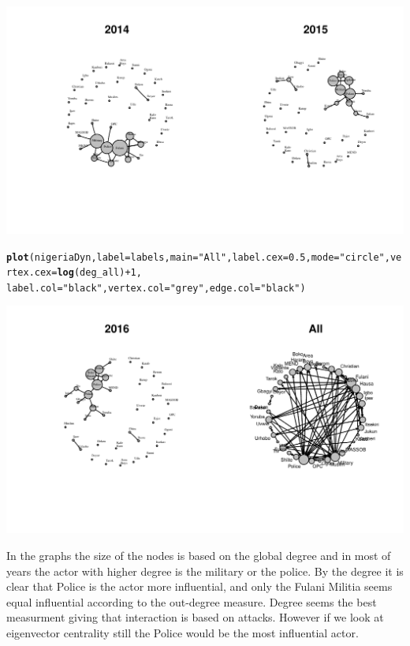 \documentclass[12pt, letterpaper, notitlepage, onecolumn, twoside, openbib]{article}\usepackage[]{graphicx}\usepackage[]{color}
\makeatletter
\newcommand{\hlnum}[1]{\textcolor[rgb]{0.686,0.059,0.569}{#1}}%
\newcommand{\hlstr}[1]{\textcolor[rgb]{0.192,0.494,0.8}{#1}}%
\newcommand{\hlopt}[1]{\textcolor[rgb]{0,0,0}{#1}}%
\newcommand{\hlstd}[1]{\textcolor[rgb]{0.345,0.345,0.345}{#1}}%
\newcommand{\hlkwc}[1]{\textcolor[rgb]{0.333,0.667,0.333}{#1}}%
\newcommand{\hlkwd}[1]{\textcolor[rgb]{0.737,0.353,0.396}{\textbf{#1}}}%
\newenvironment{kframe}{%
 \def\at@end@of@kframe{}%
 \ifinner\ifhmode%
  \def\at@end@of@kframe{\end{minipage}}%
  \begin{minipage}{\columnwidth}%
 \fi\fi%
 \def\FrameCommand##1{\hskip\@totalleftmargin \hskip-\fboxsep
 \colorbox{shadecolor}{##1}\hskip-\fboxsep
     \hskip-\linewidth \hskip-\@totalleftmargin \hskip\columnwidth}%
 \MakeFramed {\advance\hsize-\width
   \@totalleftmargin\z@ \linewidth\hsize
   \@setminipage}}%
 {\par\unskip\endMakeFramed%
 \at@end@of@kframe}
\newenvironment{knitrout}{}{} %
\makeatother
\begin{document}
\begin{knitrout}
\includegraphics[width=1.1\linewidth]{figure/unnamed-chunk-4-8} 
\begin{kframe}\begin{alltt}
\hlkwd{plot}\hlstd{(nigeriaDyn,} \hlkwc{label} \hlstd{= labels,} \hlkwc{main}\hlstd{=}\hlstr{"All"}\hlstd{,} \hlkwc{label.cex}\hlstd{=}\hlnum{0.5}\hlstd{,} \hlkwc{mode}\hlstd{=}\hlstr{"circle"}\hlstd{,} \hlkwc{vertex.cex}\hlstd{=}\hlkwd{log}\hlstd{(deg_all)}\hlopt{+}\hlnum{1}\hlstd{,}
     \hlkwc{label.col}\hlstd{=}\hlstr{"black"}\hlstd{,} \hlkwc{vertex.col}\hlstd{=}\hlstr{"grey"}\hlstd{,} \hlkwc{edge.col}\hlstd{=}\hlstr{"black"}\hlstd{)}
\end{alltt}
\end{kframe}
\includegraphics[width=1.1\linewidth]{figure/unnamed-chunk-4-9} 

\end{knitrout}


In the graphs the size of the nodes is based on the global degree and in  most of years the actor with higher degree is the military or the police. By the degree it is clear that Police is the actor more influential, and only the Fulani Militia seems equal influential according to the out-degree measure. Degree seems the best measurment giving that interaction is based on attacks. However if we look at eigenvector centrality still the Police would be the most influential actor. 
\end{document}
